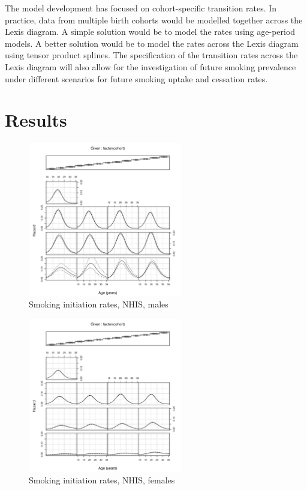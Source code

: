 \documentclass[11pt,a4paper]{article}
\begin{document}
The model development has focused on cohort-specific transition rates.
In practice, data from multiple birth cohorts would be modelled
together across the Lexis diagram. A simple solution would be to model
the rates using age-period models. A better solution would be to model
the rates across the Lexis diagram using tensor product splines.
The specification of the transition rates across the Lexis diagram
will also allow for the investigation of future smoking prevalence
under different scenarios for future smoking uptake and cessation rates.


\section{Results}

\begin{figure}[h]
  \centering
  \includegraphics[width=0.6\textwidth]{coplot-1.pdf}    
  \caption{Smoking initiation rates, NHIS, males}
  \label{fig:init-males}
\end{figure}
\begin{figure}[h]
  \centering
  \includegraphics[width=0.6\textwidth]{coplot-2.pdf}    
  \caption{Smoking initiation rates, NHIS, females}
  \label{fig:init-males}
\end{figure}
\end{document}
